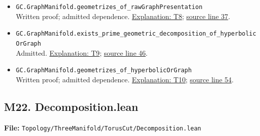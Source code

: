 \documentclass[
  letterpaper,
  11pt]{article}
\begin{document}
\begin{itemize}
{  line 31}.
\item
  {\small\texttt{GC.\allowbreak{}Graph\allowbreak{}Manifold.\allowbreak{}geometrizes\_\allowbreak{}of\_\allowbreak{}raw\allowbreak{}Graph\allowbreak{}Presentation}}\\
  Written proof; admitted dependence. \hyperref[t8]{Explanation: T8};
  \href{https://github.com/qinz1yang/differential-geometry-dev/blob/ea0fae60ee01ef8c8d9b57a51794c6538f679c5d/DifferentialGeometry/Topology/ThreeManifold/GraphManifold/Refinement.lean\#L37}{source
  line 37}.
\item
  {\small\texttt{GC.\allowbreak{}Graph\allowbreak{}Manifold.\allowbreak{}exists\_\allowbreak{}prime\_\allowbreak{}geometric\_\allowbreak{}decomposition\_\allowbreak{}of\_\allowbreak{}hyperbolic\allowbreak{}Or\allowbreak{}Graph}}\\
  Admitted. \hyperref[t9]{Explanation: T9};
  \href{https://github.com/qinz1yang/differential-geometry-dev/blob/ea0fae60ee01ef8c8d9b57a51794c6538f679c5d/DifferentialGeometry/Topology/ThreeManifold/GraphManifold/Refinement.lean\#L46}{source
  line 46}.
\item
  {\small\texttt{GC.\allowbreak{}Graph\allowbreak{}Manifold.\allowbreak{}geometrizes\_\allowbreak{}of\_\allowbreak{}hyperbolic\allowbreak{}Or\allowbreak{}Graph}}\\
  Written proof; admitted dependence. \hyperref[t10]{Explanation: T10};
  \href{https://github.com/qinz1yang/differential-geometry-dev/blob/ea0fae60ee01ef8c8d9b57a51794c6538f679c5d/DifferentialGeometry/Topology/ThreeManifold/GraphManifold/Refinement.lean\#L54}{source
  line 54}.
\end{itemize}


\subsection{M22. Decomposition.lean}\label{m22.-decomposition.lean}

\textbf{File:}
{\small\texttt{Topology/\allowbreak{}Three\allowbreak{}Manifold/\allowbreak{}Torus\allowbreak{}Cut/\allowbreak{}Decomposition.\allowbreak{}lean}}
\end{document}

